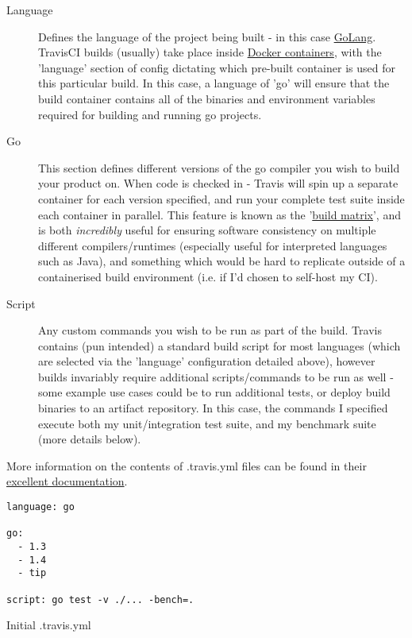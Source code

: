 \begin{description}
  \item[Language] Defines the language of the project being built - in this case
  \href{https://golang.org/}{GoLang}. TravisCI builds (usually) take place
  inside \href{https://www.docker.com/what-docker}{Docker containers}, with the
  'language' section of config dictating which pre-built container is used for
  this particular build. In this case, a language of 'go' will ensure that the
  build container contains all of the binaries and environment variables required
  for building and running go projects.
  \item[Go] This section defines different versions of the go compiler you wish
  to build your product on. When code is checked in - Travis will spin up a
  separate container for each version specified, and run your complete test suite
  inside each container in parallel. This feature is known as the
  '\href{https://docs.travis-ci.com/user/customizing-the-build/#Build-Matrix}{build matrix}',
  and is both \emph{incredibly} useful for ensuring software consistency on multiple
  different compilers/runtimes (especially useful for interpreted languages such
  as Java), and something which would be hard to replicate outside of a
  containerised build environment (i.e. if I'd chosen to self-host my CI).
  \item[Script] Any custom commands you wish to be run as part of the build.
  Travis contains (pun intended) a standard build script for most languages (which
  are selected via the 'language' configuration detailed above), however builds
  invariably require additional scripts/commands to be run as well - some example
  use cases could be to run additional tests, or deploy build binaries to an
  artifact repository. In this case, the commands I specified execute both my
  unit/integration test suite, and my benchmark suite (more details below).
\end{description}

More information on the contents of .travis.yml files can be found in their
\href{https://docs.travis-ci.com/}{excellent documentation}.

\begin{listing}
  \centering
  \begin{verbatim}
language: go

go:
  - 1.3
  - 1.4
  - tip

script: go test -v ./... -bench=.
  \end{verbatim}
  \caption{Initial .travis.yml}
  \label{lst:initialTravis}
\end{listing}


